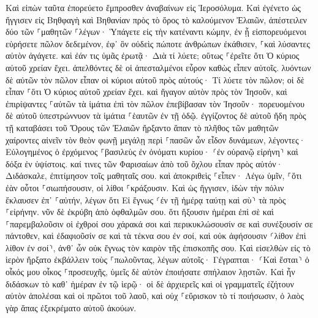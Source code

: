 \documentclass[twoside, 9pt]{extreport}
\begin{document}
Καὶ εἰπὼν ταῦτα ἐπορεύετο ἔμπροσθεν ἀναβαίνων εἰς Ἱεροσόλυμα. 
Καὶ ἐγένετο ὡς ἤγγισεν εἰς Βηθφαγὴ καὶ Βηθανίαν πρὸς τὸ ὄρος τὸ καλούμενον Ἐλαιῶν, ἀπέστειλεν δύο τῶν ⸀μαθητῶν 
⸀λέγων· Ὑπάγετε εἰς τὴν κατέναντι κώμην, ἐν ᾗ εἰσπορευόμενοι εὑρήσετε πῶλον δεδεμένον, ἐφ᾽ ὃν οὐδεὶς πώποτε ἀνθρώπων ἐκάθισεν, ⸀καὶ λύσαντες αὐτὸν ἀγάγετε. 
καὶ ἐάν τις ὑμᾶς ἐρωτᾷ· Διὰ τί λύετε; οὕτως ⸀ἐρεῖτε ὅτι Ὁ κύριος αὐτοῦ χρείαν ἔχει. 
ἀπελθόντες δὲ οἱ ἀπεσταλμένοι εὗρον καθὼς εἶπεν αὐτοῖς. 
λυόντων δὲ αὐτῶν τὸν πῶλον εἶπαν οἱ κύριοι αὐτοῦ πρὸς αὐτούς· Τί λύετε τὸν πῶλον; 
οἱ δὲ εἶπαν ⸀ὅτι Ὁ κύριος αὐτοῦ χρείαν ἔχει. 
καὶ ἤγαγον αὐτὸν πρὸς τὸν Ἰησοῦν, καὶ ἐπιρίψαντες ⸀αὐτῶν τὰ ἱμάτια ἐπὶ τὸν πῶλον ἐπεβίβασαν τὸν Ἰησοῦν· 
πορευομένου δὲ αὐτοῦ ὑπεστρώννυον τὰ ἱμάτια ⸀ἑαυτῶν ἐν τῇ ὁδῷ. 
ἐγγίζοντος δὲ αὐτοῦ ἤδη πρὸς τῇ καταβάσει τοῦ Ὄρους τῶν Ἐλαιῶν ἤρξαντο ἅπαν τὸ πλῆθος τῶν μαθητῶν χαίροντες αἰνεῖν τὸν θεὸν φωνῇ μεγάλῃ περὶ ⸀πασῶν ὧν εἶδον δυνάμεων, 
λέγοντες· Εὐλογημένος ὁ ἐρχόμενος ⸀βασιλεὺς ἐν ὀνόματι κυρίου· ⸂ἐν οὐρανῷ εἰρήνη⸃ καὶ δόξα ἐν ὑψίστοις. 
καί τινες τῶν Φαρισαίων ἀπὸ τοῦ ὄχλου εἶπαν πρὸς αὐτόν· Διδάσκαλε, ἐπιτίμησον τοῖς μαθηταῖς σου. 
καὶ ἀποκριθεὶς ⸀εἶπεν· Λέγω ὑμῖν, ⸀ὅτι ἐὰν οὗτοι ⸀σιωπήσουσιν, οἱ λίθοι ⸀κράξουσιν. 
Καὶ ὡς ἤγγισεν, ἰδὼν τὴν πόλιν ἔκλαυσεν ἐπ᾽ ⸀αὐτήν, 
λέγων ὅτι Εἰ ἔγνως ⸂ἐν τῇ ἡμέρᾳ ταύτῃ καὶ σὺ⸃ τὰ πρὸς ⸀εἰρήνην. νῦν δὲ ἐκρύβη ἀπὸ ὀφθαλμῶν σου. 
ὅτι ἥξουσιν ἡμέραι ἐπὶ σὲ καὶ ⸀παρεμβαλοῦσιν οἱ ἐχθροί σου χάρακά σοι καὶ περικυκλώσουσίν σε καὶ συνέξουσίν σε πάντοθεν, 
καὶ ἐδαφιοῦσίν σε καὶ τὰ τέκνα σου ἐν σοί, καὶ οὐκ ἀφήσουσιν ⸂λίθον ἐπὶ λίθον ἐν σοί⸃, ἀνθ᾽ ὧν οὐκ ἔγνως τὸν καιρὸν τῆς ἐπισκοπῆς σου. 
Καὶ εἰσελθὼν εἰς τὸ ἱερὸν ἤρξατο ἐκβάλλειν τοὺς ⸀πωλοῦντας, 
λέγων αὐτοῖς· Γέγραπται· ⸂Καὶ ἔσται⸃ ὁ οἶκός μου οἶκος ⸀προσευχῆς, ὑμεῖς δὲ αὐτὸν ἐποιήσατε σπήλαιον λῃστῶν. 
Καὶ ἦν διδάσκων τὸ καθ᾽ ἡμέραν ἐν τῷ ἱερῷ· οἱ δὲ ἀρχιερεῖς καὶ οἱ γραμματεῖς ἐζήτουν αὐτὸν ἀπολέσαι καὶ οἱ πρῶτοι τοῦ λαοῦ, 
καὶ οὐχ ⸀εὕρισκον τὸ τί ποιήσωσιν, ὁ λαὸς γὰρ ἅπας ἐξεκρέματο αὐτοῦ ἀκούων. 
\end{document}

